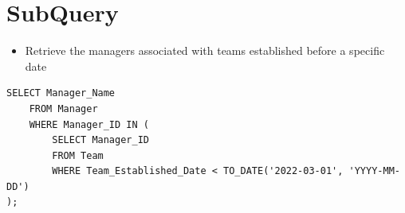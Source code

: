 \section{SubQuery}
\hrulefill

\begin{itemize}
    \item Retrieve the managers associated with teams established before a specific date
\end{itemize}

\begin{lstlisting}[caption={ Query 1},label={lst:q-1}]
    SELECT Manager_Name
    FROM Manager
    WHERE Manager_ID IN (
        SELECT Manager_ID
        FROM Team
        WHERE Team_Established_Date < TO_DATE('2022-03-01', 'YYYY-MM-DD')
);
\end{lstlisting}

